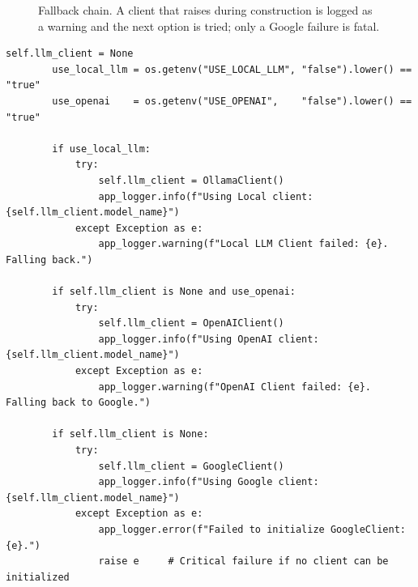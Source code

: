 \begin{figure}[H]
\centering
{}
\caption{Fallback chain. A client that raises during construction is logged as a warning and the next option is tried; only a Google failure is fatal.}
\end{figure}

\begin{lstlisting}[style=py,firstnumber=48]
        self.llm_client = None
        use_local_llm = os.getenv("USE_LOCAL_LLM", "false").lower() == "true"
        use_openai    = os.getenv("USE_OPENAI",    "false").lower() == "true"

        if use_local_llm:
            try:
                self.llm_client = OllamaClient()
                app_logger.info(f"Using Local client: {self.llm_client.model_name}")
            except Exception as e:
                app_logger.warning(f"Local LLM Client failed: {e}. Falling back.")

        if self.llm_client is None and use_openai:
            try:
                self.llm_client = OpenAIClient()
                app_logger.info(f"Using OpenAI client: {self.llm_client.model_name}")
            except Exception as e:
                app_logger.warning(f"OpenAI Client failed: {e}. Falling back to Google.")

        if self.llm_client is None:
            try:
                self.llm_client = GoogleClient()
                app_logger.info(f"Using Google client: {self.llm_client.model_name}")
            except Exception as e:
                app_logger.error(f"Failed to initialize GoogleClient: {e}.")
                raise e     # Critical failure if no client can be initialized
\end{lstlisting}

